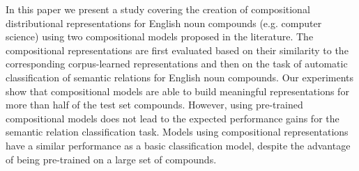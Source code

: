 In this paper we present a study covering the creation of compositional distributional representations for English noun compounds (e.g. computer science) using two compositional models proposed in the literature. The compositional representations are first evaluated based on their similarity to the corresponding corpus-learned representations and then on the task of automatic classification of semantic relations for English noun compounds. Our experiments show that compositional models are able to build meaningful representations for more than half of the test set compounds. However, using pre-trained compositional models does not lead to the expected performance gains for the semantic relation classification task. Models using compositional representations have a similar performance as a basic classification model, despite the advantage of being pre-trained on a large set of compounds.
